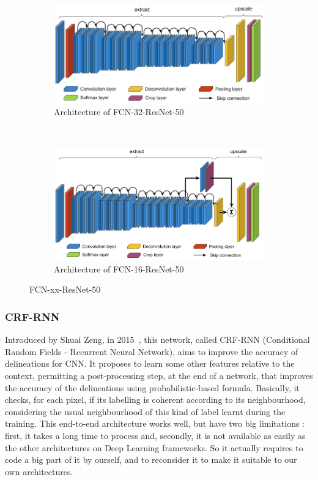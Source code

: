 \begin{figure}[ht!]
\centering
\begin{subfigure}{.9\textwidth}
  \centering
  \includegraphics[width=0.9\linewidth,center]{images/part1/fcn32_resnet_architecture.png}
  \caption{Architecture of FCN-32-ResNet-50}
\end{subfigure}%
\label{fig:part1:fcn-resnets:32}
\\
\begin{subfigure}{\textwidth}
  \centering
  \includegraphics[width=\linewidth,center]{images/part1/fcn16_resnet_architecture.png}
  \caption{Architecture of FCN-16-ResNet-50}
\end{subfigure}
\label{fig:part1:fcn-resnets:16}
\caption{FCN-xx-ResNet-50}
\end{figure}
\label{fig:part1:fcn-resnets}

\subsubsection{CRF-RNN} Introduced by Shuai Zeng, in 2015~\cite{ZHEN15}, this network, called CRF-RNN (Conditional Random Fields - Recurrent Neural Network), aims to improve the accuracy of delineations for CNN. It proposes to learn some other features relative to the context, permitting a post-processing step, at the end of a network, that improves the accuracy of the delineations using probabilistic-based formula. Basically, it checks, for each pixel, if its labelling is coherent according to its neighbourhood, considering the usual neighbourhood of this kind of label learnt during the training. This end-to-end architecture works well, but have two big limitations : first, it takes a long time to process and, secondly, it is not available as easily as the other architectures on Deep Learning frameworks. So it actually requires to code a big part of it by ourself, and to reconsider it to make it suitable to our own architectures.

